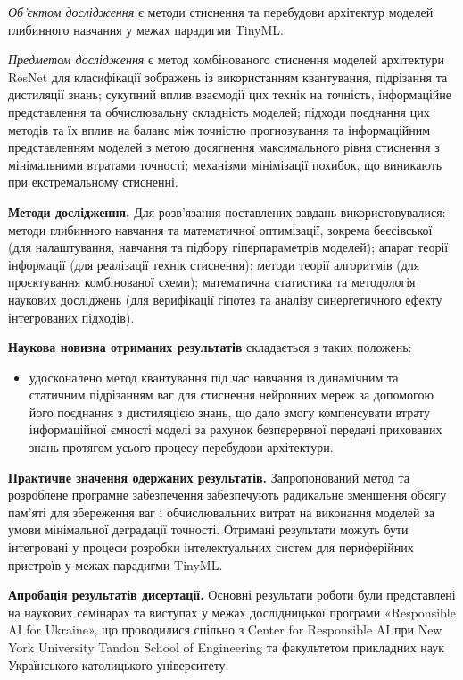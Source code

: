 \documentclass{pma-mthesis}
\begin{document}
\textit{Об’єктом дослідження} є методи стиснення та перебудови архітектур моделей глибинного навчання у межах парадигми TinyML.

\textit{Предметом дослідження} є метод комбінованого стиснення моделей архітектури ResNet для класифікації зображень із використанням квантування, підрізання та дистиляції знань; сукупний вплив взаємодії цих технік на точність, інформаційне представлення та обчислювальну складність моделей; підходи поєднання цих методів та їх вплив на баланс між точністю прогнозування та інформаційним представленням моделей з метою досягнення максимального рівня стиснення з мінімальними втратами точності; механізми мінімізації похибок, що виникають при екстремальному стисненні.

\textbf{Методи дослідження.} Для розв’язання поставлених завдань використовувалися: методи глибинного навчання та математичної оптимізації, зокрема беєсівської (для налаштування, навчання та підбору гіперпараметрів моделей); апарат теорії інформації (для реалізації технік стиснення); методи теорії алгоритмів (для проєктування комбінованої схеми); математична статистика та методологія наукових досліджень (для верифікації гіпотез та аналізу синергетичного ефекту інтегрованих підходів).

\textbf{Наукова новизна отриманих результатів} складається з таких положень:
    \begin{itemize}[label=--, partopsep=0pt, parsep=0pt, topsep=0pt, itemsep=0pt, itemindent=1.7cm, leftmargin=0pt]
        \item удосконалено метод квантування під час навчання із динамічним та статичним підрізанням ваг для стиснення нейронних мереж за допомогою його поєднання з дистиляцією знань, що дало змогу компенсувати втрату інформаційної ємності моделі за рахунок безперервної передачі прихованих знань протягом усього процесу перебудови архітектури.
    \end{itemize}

\textbf{Практичне значення одержаних результатів.} Запропонований метод та розроблене програмне забезпечення забезпечують радикальне зменшення обсягу пам’яті для збереження ваг і обчислювальних витрат на виконання моделей за умови мінімальної деградації точності. Отримані результати можуть бути інтегровані у процеси розробки інтелектуальних систем для периферійних пристроїв у межах парадигми TinyML.

\textbf{Апробація результатів дисертації.} Основні результати роботи були представлені на наукових семінарах та виступах у межах дослідницької програми «Responsible AI for Ukraine», що проводилися спільно з Center for Responsible AI при New York University Tandon School of Engineering та факультетом прикладних наук Українського католицького університету.
\end{document}

